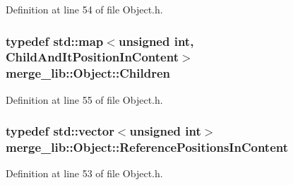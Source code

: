 Definition at line 54 of file Object.\-h.

\hypertarget{classmerge__lib_1_1_object_a4e1f3bf43d9fc39fea3829f7ae1da4a8}{
\subsubsection[{Children}]{\setlength{\rightskip}{0pt plus 5cm}typedef std\-::map$<$unsigned int, {\bf Child\-And\-It\-Position\-In\-Content}$>$ {\bf merge\-\_\-lib\-::\-Object\-::\-Children}}}\label{d7/df1/classmerge__lib_1_1_object_a4e1f3bf43d9fc39fea3829f7ae1da4a8}


Definition at line 55 of file Object.\-h.

\hypertarget{classmerge__lib_1_1_object_aa3326883ea53ef2e2a33e2b81a7cc98c}{
\subsubsection[{Reference\-Positions\-In\-Content}]{\setlength{\rightskip}{0pt plus 5cm}typedef std\-::vector$<$unsigned int$>$ {\bf merge\-\_\-lib\-::\-Object\-::\-Reference\-Positions\-In\-Content}}}\label{d7/df1/classmerge__lib_1_1_object_aa3326883ea53ef2e2a33e2b81a7cc98c}


Definition at line 53 of file Object.\-h.



